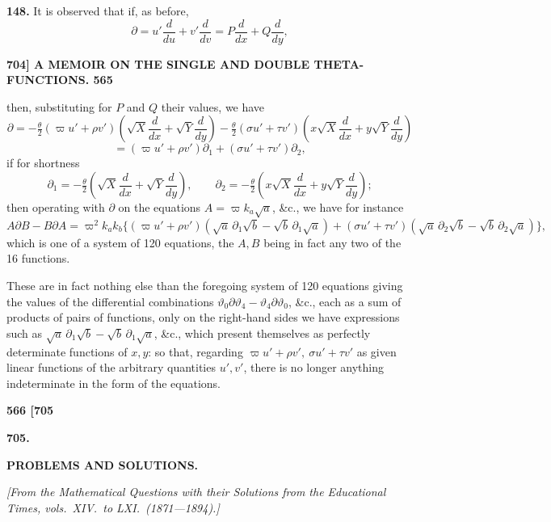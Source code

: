 \documentclass[11pt]{article}
\begin{document}
\medskip
\textbf{148.} It is observed that if, as before,
\[
\partial = u'\frac{d}{du} + v'\frac{d}{dv} = P\frac{d}{dx} + Q\frac{d}{dy},
\]

\newpage
\noindent\textbf{704] \quad A MEMOIR ON THE SINGLE AND DOUBLE THETA-FUNCTIONS. \hfill 565}

\medskip
then, substituting for $P$ and $Q$ their values, we have
\[
\partial = -\tfrac{\theta}{2}(\varpi u' + \rho v')\!\left(\!\sqrt{X}\frac{d}{dx} + \sqrt{Y}\frac{d}{dy}\!\right) - \tfrac{\theta}{2}(\sigma u' + \tau v')\!\left(\!x\sqrt{X}\frac{d}{dx} + y\sqrt{Y}\frac{d}{dy}\!\right)
\]
\[
= (\varpi u' + \rho v')\partial_1 + (\sigma u' + \tau v')\partial_2,
\]
if for shortness
\[
\partial_1 = -\tfrac{\theta}{2}\!\left(\!\sqrt{X}\frac{d}{dx} + \sqrt{Y}\frac{d}{dy}\!\right),\qquad \partial_2 = -\tfrac{\theta}{2}\!\left(\!x\sqrt{X}\frac{d}{dx} + y\sqrt{Y}\frac{d}{dy}\!\right);
\]
then operating with $\partial$ on the equations $A = \varpi k_a\sqrt{a}$, \&c., we have for instance
\[
A\partial B - B\partial A = \varpi^2 k_a k_b\bigl\{(\varpi u' + \rho v')(\sqrt{a}\,\partial_1\sqrt{b} - \sqrt{b}\,\partial_1\sqrt{a}) + (\sigma u' + \tau v')(\sqrt{a}\,\partial_2\sqrt{b} - \sqrt{b}\,\partial_2\sqrt{a})\bigr\},
\]
which is one of a system of 120 equations, the $A, B$ being in fact any two of the 16 functions.

\medskip
These are in fact nothing else than the foregoing system of 120 equations giving the values of the differential combinations $\vartheta_0\partial\vartheta_4 - \vartheta_4\partial\vartheta_0$, \&c., each as a sum of products of pairs of functions, only on the right-hand sides we have expressions such as $\sqrt{a}\,\partial_1\sqrt{b} - \sqrt{b}\,\partial_1\sqrt{a}$, \&c., which present themselves as perfectly determinate functions of $x, y$: so that, regarding $\varpi u' + \rho v',\ \sigma u' + \tau v'$ as given linear functions of the arbitrary quantities $u', v'$, there is no longer anything indeterminate in the form of the equations.

\newpage
\noindent\textbf{566 \hfill \hfill [705}

\bigskip
\begin{center}\textbf{\Large 705.}\end{center}

\medskip
\begin{center}\textbf{PROBLEMS AND SOLUTIONS.}\end{center}

\medskip
\begin{center}\textit{[From the Mathematical Questions with their Solutions from the Educational Times, vols.\ XIV.\ to LXI.\ (1871---1894).]}\end{center}
\end{document}

